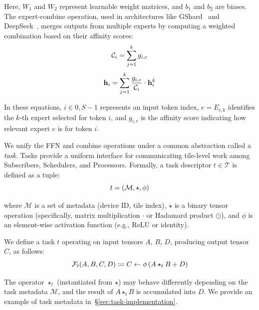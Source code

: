 Here, $W_1$ and $W_2$ represent learnable weight matrices, and $b_1$ and $b_2$ are biases.
The expert-combine operation, used in architectures like GShard~\cite{DBLP:conf/iclr/LepikhinLXCFHKS21} and DeepSeek~\cite{deepep}, merges outputs from multiple experts by computing a weighted combination based on their affinity scores:
\begin{equation}\label{eq:combine1}\small
\mathcal{C}_i = \sum\limits_{j = 1}^k g_{i, e}
\end{equation}
\begin{equation}\label{eq:combine2}\small
\mathbf{h}_i = \sum\limits_{j = 1}^k \frac{g_{i, e}}{\mathcal{C}_i}\cdot \mathbf{h}_i^k
\end{equation}

In these equations, $i \in {0, S - 1}$ represents an input token index, $e = E_{i,k}$ identifies the $k$-th expert selected for token $i$, and $g_{i,e}$ is the affinity score indicating how relevant expert $e$ is for token $i$.

We unify the FFN and combine operations under a common abstraction called a \emph{task}. Tasks provide a uniform interface for communicating tile-level work among Subscribers, Schedulers, and Processors. Formally, a task descriptor $t \in \mathcal{T}$ is defined as a tuple:
\[\small
    t = (\mathcal{M}, \star, \phi)
\]

where $\mathcal{M}$ is a set of metadata (\eg  device ID, tile index), $\star$ is a binary tensor operation (specifically, matrix multiplication $\cdot$ or Hadamard product $\odot$), and $\phi$ is an element-wise activation function (e.g., ReLU or identity). 

We define a task $t$ operating on input tensors $A$, $B$, $D$, producing output tensor $C$, as follows:
\begin{equation}\label{eq:task_def}\small
    \mathcal{F}_t(A, B, C, D) \coloneqq C \gets \phi\left(A \star_t B + D\right)
\end{equation}

The operator $\star_t$ (instantiated from $\star$) may behave differently depending on the task metadata $\mathcal{M}$, and the result of $A \star_t B$ is accumulated into $D$. We provide an example of task metadata in~\S\ref{sec:task-implementation}.

